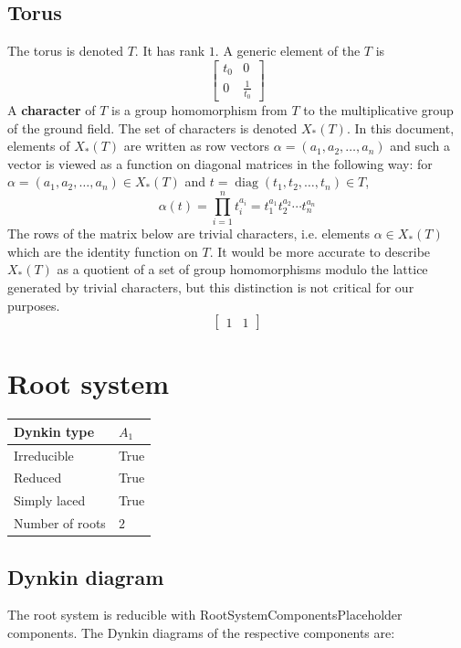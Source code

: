 \documentclass[11pt]{article}
\newcommand{\tbf}{\textbf}
\DeclareMathOperator{\diag}{diag}
\theoremstyle{definition}
\newif\ifrootsystemirreducible
\begin{document}
\subsection{Torus}

The torus is denoted $T$. It has rank $1$. A generic element of the $T$ is
\[
\left[\begin{matrix}t_{0} & 0\\0 & \frac{1}{t_{0}}\end{matrix}\right]
\]
A \tbf{character} of $T$ is a group homomorphism from $T$ to the multiplicative group of the ground field. The set of characters is denoted $X_*(T)$. In this document, elements of $X_*(T)$ are written as row vectors $\alpha = (a_1, a_2, \ldots, a_n)$ and such a vector is viewed as a function on diagonal matrices in the following way: for $\alpha = (a_1, a_2, \ldots, a_n) \in X_*(T)$ and $t = \diag(t_1, t_2, \ldots, t_n) \in T$, 
\[
	\alpha(t) = \prod_{i=1}^n t_i^{a_i} = t_1^{a_1} t_2^{a_2} \cdots t_n^{a_n}
\]
The rows of the matrix below are trivial characters, i.e. elements $\alpha \in X_*(T)$ which are the identity function on $T$. It would be more accurate to describe $X_*(T)$ as a quotient of a set of group homomorphisms modulo the lattice generated by trivial characters, but this distinction is not critical for our purposes.
\[
\left[\begin{matrix}1 & 1\end{matrix}\right]
\]

\newpage
\section{Root system}

\begin{tabular}{|l|l|}
	\hline
    Dynkin type & $A_1$ \\
	\hline
    Irreducible & True \\
	\hline
    Reduced & True \\
	\hline
	Simply laced & True \\
	\hline
	Number of roots & $2$ \\
	\hline
\end{tabular}

\subsection{Dynkin diagram}

\ifrootsystemirreducible
The root system is irreducible and has Dynkin diagram:
\else
The root system is reducible with RootSystemComponentsPlaceholder components. The Dynkin diagrams of the respective components are:
\fi
\end{document}
